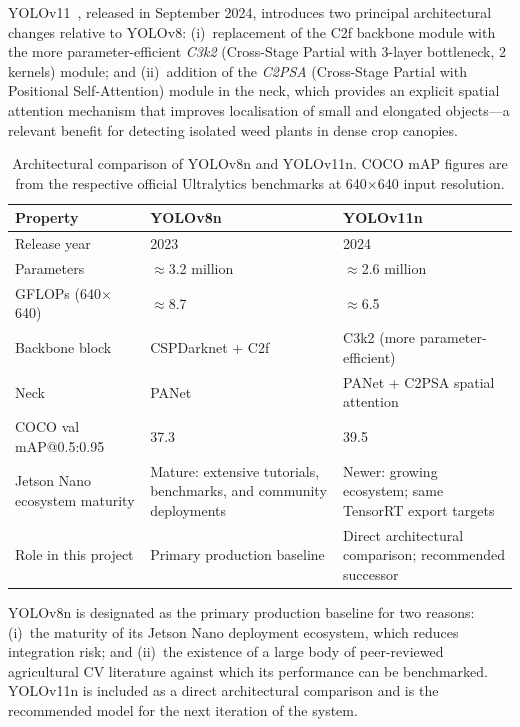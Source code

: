 \documentclass[12pt,a4paper]{report}
\renewcommand{\arraystretch}{1.3}
\begin{document}
YOLOv11~\cite{Ultralytics2024}, released in September 2024, introduces two principal architectural changes relative to YOLOv8: (i)~replacement of the C2f backbone module with the more parameter-efficient \emph{C3k2} (Cross-Stage Partial with 3-layer bottleneck, 2 kernels) module; and (ii)~addition of the \emph{C2PSA} (Cross-Stage Partial with Positional Self-Attention) module in the neck, which provides an explicit spatial attention mechanism that improves localisation of small and elongated objects---a relevant benefit for detecting isolated weed plants in dense crop canopies.

\begin{table}[H]
\centering
\small
\caption{Architectural comparison of YOLOv8n and YOLOv11n. COCO mAP figures are from the respective official Ultralytics benchmarks at 640$\times$640 input resolution.}
\label{tab:yolo_comparison}
\setlength{\tabcolsep}{4pt}
\renewcommand{\arraystretch}{1.3}
\begin{tabular}{|P{0.28\textwidth}|P{0.31\textwidth}|P{0.31\textwidth}|}
\hline
{}
\textbf{Property} & \textbf{YOLOv8n} & \textbf{YOLOv11n} \\
\hline
Release year & 2023 & 2024 \\
\hline
{}
Parameters & $\approx$3.2 million & $\approx$2.6 million \\
\hline
GFLOPs (640$\times$640) & $\approx$8.7 & $\approx$6.5 \\
\hline
{}
Backbone block & CSPDarknet + C2f & C3k2 (more parameter-efficient) \\
\hline
Neck & PANet & PANet + C2PSA spatial attention \\
\hline
{}
COCO val mAP@0.5:0.95 & 37.3 & 39.5 \\
\hline
Jetson Nano ecosystem maturity & Mature: extensive tutorials, benchmarks, and community deployments & Newer: growing ecosystem; same TensorRT export targets \\
\hline
Role in this project & Primary production baseline & Direct architectural comparison; recommended successor \\
\hline
\end{tabular}
\end{table}

YOLOv8n is designated as the primary production baseline for two reasons: (i)~the maturity of its Jetson Nano deployment ecosystem, which reduces integration risk; and (ii)~the existence of a large body of peer-reviewed agricultural CV literature against which its performance can be benchmarked. YOLOv11n is included as a direct architectural comparison and is the recommended model for the next iteration of the system.
\end{document}
